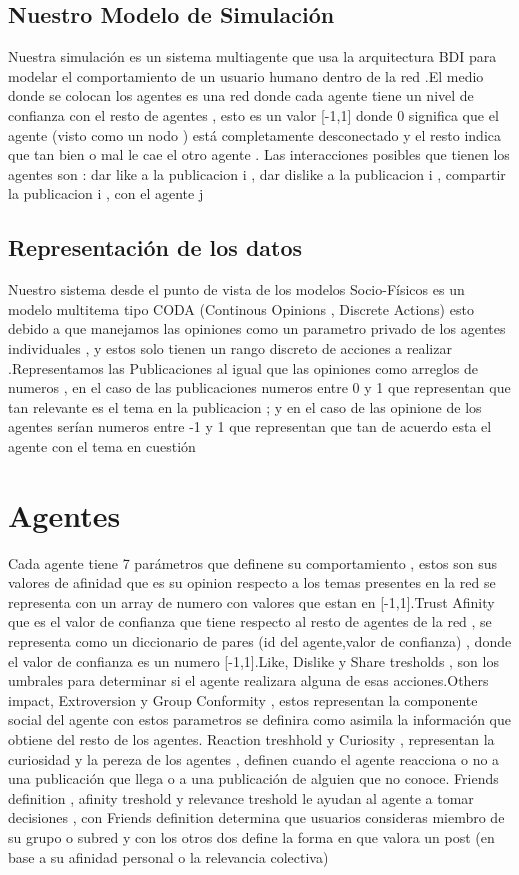 \documentclass[acmtog]{acmart}
\begin{document}
\subsection{Nuestro Modelo de Simulación}

Nuestra simulación es un sistema multiagente que usa la arquitectura BDI para modelar el comportamiento de un usuario humano dentro de la red .El medio donde se colocan los agentes es una red donde cada agente tiene un nivel de confianza con el resto de agentes , esto es un valor [-1,1] donde 0 significa que el agente (visto como un nodo ) está completamente desconectado y el resto indica que tan bien o mal le cae el otro agente . Las interacciones posibles que tienen los agentes son : dar like a la publicacion i , dar dislike a la publicacion i , compartir la publicacion i , con el agente j 

\subsection{Representación de los datos}
Nuestro sistema desde el punto de vista de los modelos Socio-Físicos es un modelo multitema tipo CODA (Continous Opinions , Discrete Actions) esto debido a que manejamos las opiniones como un parametro privado de los agentes individuales , y estos solo tienen un rango discreto de acciones a realizar .Representamos las Publicaciones al igual que las opiniones como arreglos de numeros , en el caso de las publicaciones numeros entre 0 y 1 que representan que tan relevante es el tema en la publicacion ; y en el caso de las opinione de los agentes serían numeros entre -1 y 1 que representan que tan de acuerdo esta el agente con el tema en cuestión 

\section{Agentes}
Cada agente tiene 7 parámetros que definene su comportamiento , estos son sus valores de afinidad que es su opinion respecto a los temas presentes en la red se representa con un array de numero con valores que estan en [-1,1].Trust Afinity que es el valor de confianza que tiene respecto al resto de agentes de la red , se representa como un diccionario de pares (id del agente,valor de confianza) , donde el valor de confianza es un numero [-1,1].Like, Dislike y Share tresholds , son los umbrales para determinar si el agente realizara alguna de esas acciones.Others impact, Extroversion y Group Conformity , estos representan la componente social del agente con estos parametros se definira como asimila la información que obtiene del resto de los agentes. Reaction treshhold y Curiosity , representan la curiosidad y la pereza de los agentes , definen cuando el agente reacciona o no a una publicación que llega o a una publicación de alguien que no conoce. Friends definition , afinity treshold y relevance treshold le ayudan al agente a tomar decisiones , con Friends definition determina que usuarios consideras miembro de su grupo o subred y con los otros dos define la forma en que valora un post (en base a su afinidad personal o la relevancia colectiva)
\end{document}
